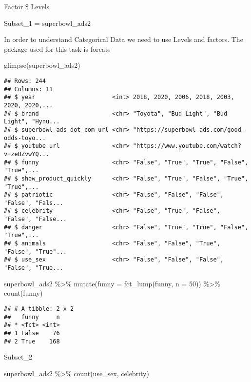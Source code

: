 \documentclass[
]{article}
\newenvironment{Shaded}{\begin{snugshade}}{\end{snugshade}}
\newcommand{\AttributeTok}[1]{\textcolor[rgb]{0.77,0.63,0.00}{#1}}
\newcommand{\DecValTok}[1]{\textcolor[rgb]{0.00,0.00,0.81}{#1}}
\newcommand{\FunctionTok}[1]{\textcolor[rgb]{0.00,0.00,0.00}{#1}}
\newcommand{\NormalTok}[1]{#1}
\newcommand{\SpecialCharTok}[1]{\textcolor[rgb]{0.00,0.00,0.00}{#1}}
\begin{document}
Factor \$ Levels

Subset\_1 = superbowl\_ads2

In order to understand Categorical Data we need to use Levels and
factors. The package used for this task is forcats

\begin{Shaded}
\begin{Highlighting}[]
\FunctionTok{glimpse}\NormalTok{(superbowl\_ads2)}
\end{Highlighting}
\end{Shaded}

\begin{verbatim}
## Rows: 244
## Columns: 11
## $ year                      <int> 2018, 2020, 2006, 2018, 2003, 2020, 2020,...
## $ brand                     <chr> "Toyota", "Bud Light", "Bud Light", "Hynu...
## $ superbowl_ads_dot_com_url <chr> "https://superbowl-ads.com/good-odds-toyo...
## $ youtube_url               <chr> "https://www.youtube.com/watch?v=zeBZvwYQ...
## $ funny                     <chr> "False", "True", "True", "False", "True",...
## $ show_product_quickly      <chr> "False", "True", "False", "True", "True",...
## $ patriotic                 <chr> "False", "False", "False", "False", "Fals...
## $ celebrity                 <chr> "False", "True", "False", "False", "False...
## $ danger                    <chr> "False", "True", "True", "False", "True",...
## $ animals                   <chr> "False", "False", "True", "False", "True"...
## $ use_sex                   <chr> "False", "False", "False", "False", "True...
\end{verbatim}

\begin{Shaded}
\begin{Highlighting}[]
\NormalTok{superbowl\_ads2 }\SpecialCharTok{\%\textgreater{}\%}
  \FunctionTok{mutate}\NormalTok{(}\AttributeTok{funny =} \FunctionTok{fct\_lump}\NormalTok{(funny, }\AttributeTok{n =} \DecValTok{50}\NormalTok{)) }\SpecialCharTok{\%\textgreater{}\%}
  \FunctionTok{count}\NormalTok{(funny)}
\end{Highlighting}
\end{Shaded}

\begin{verbatim}
## # A tibble: 2 x 2
##   funny     n
## * <fct> <int>
## 1 False    76
## 2 True    168
\end{verbatim}

Subset\_2

\begin{Shaded}
\begin{Highlighting}[]
\NormalTok{superbowl\_ads2 }\SpecialCharTok{\%\textgreater{}\%}
  \FunctionTok{count}\NormalTok{(use\_sex, celebrity)}
\end{Highlighting}
\end{Shaded}
\end{document}
